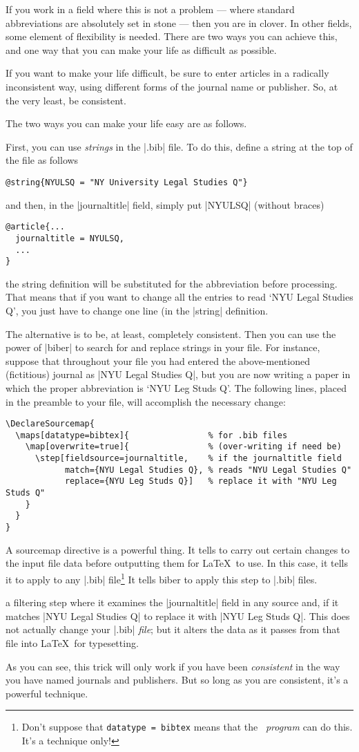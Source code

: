 {If you work in a field where this is not a problem --- where standard abbreviations are absolutely set in stone --- then you are in clover. In other fields, some element of flexibility is needed. There are two ways you can achieve this, and one way that you can make your life as difficult as possible.

If you want to make your life difficult, be sure to enter articles in a radically inconsistent way, using different forms of the journal name or publisher. So, at the very least, be consistent.

The two ways you can make your life easy are as follows.

First, you can use \emph{strings} in the |.bib| file. To do this, define a string at the top of the file as follows
\begin{verbatim}
@string{NYULSQ = "NY University Legal Studies Q"}
\end{verbatim}
and then, in the |journaltitle| field, simply put |NYULSQ| (without braces)
\begin{verbatim}
@article{...
  journaltitle = NYULSQ,
  ...
}
\end{verbatim}
the string definition will be substituted for the abbreviation before processing. That means that if you want to change all the entries to read `NYU Legal Studies Q', you just have to change one line (in the |string| definition.

The alternative is to be, at least, completely consistent. Then you can use the power of |biber| to search for and replace strings in your file. For instance, suppose that throughout your file you had entered the above-mentioned (fictitious) journal as |NYU Legal Studies Q|, but you are now writing a paper in which the proper abbreviation is `NYU Leg Studs Q'. The following lines, placed in the preamble to your file, will accomplish the necessary change:\label{datamap}

\begin{verbatim}
\DeclareSourcemap{
  \maps[datatype=bibtex]{                % for .bib files
    \map[overwrite=true]{                % (over-writing if need be)
      \step[fieldsource=journaltitle,    % if the journaltitle field
            match={NYU Legal Studies Q}, % reads "NYU Legal Studies Q"
            replace={NYU Leg Studs Q}]   % replace it with "NYU Leg Studs Q"
    }
  }
}
\end{verbatim}

A sourcemap directive is a powerful thing. It tells  to carry out certain changes to the input file data before outputting them for \LaTeX\ to use. In this case, it tells it to apply to any |.bib| file\footnote{Don't suppose that \texttt{datatype = bibtex} means that the \bibtex\ \emph{program} can do this. It's a  technique only!} It tells biber to apply this step to |.bib| files.} a filtering step where it examines the |journaltitle| field in any source and, if it matches |NYU Legal Studies Q| to replace it with |NYU Leg Studs Q|. This does not actually change your |.bib| \emph{file}; but it alters the data as it passes from that file into \LaTeX\ for typesetting.

As you can see, this trick will only work if you have been \emph{consistent} in the way you have named journals and publishers. But so long as you are consistent, it's a powerful technique.
